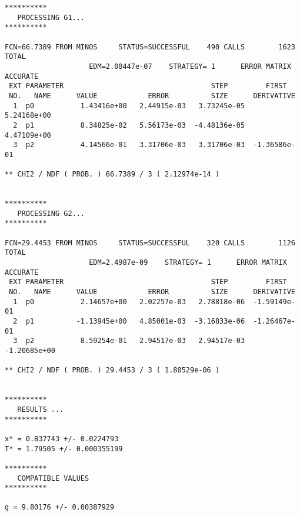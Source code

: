 {\fontsize{7}{7}
\begin{verbatim}
**********
   PROCESSING G1...
**********

FCN=66.7389 FROM MINOS     STATUS=SUCCESSFUL    490 CALLS        1623 TOTAL
                    EDM=2.00447e-07    STRATEGY= 1      ERROR MATRIX ACCURATE 
 EXT PARAMETER                                   STEP         FIRST   
 NO.   NAME      VALUE            ERROR          SIZE      DERIVATIVE 
  1  p0           1.43416e+00   2.44915e-03   3.73245e-05   5.24168e+00
  2  p1           8.34825e-02   5.56173e-03  -4.48136e-05   4.47109e+00
  3  p2           4.14566e-01   3.31706e-03   3.31706e-03  -1.36586e-01

** CHI2 / NDF ( PROB. ) 66.7389 / 3 ( 2.12974e-14 )


**********
   PROCESSING G2...
**********

FCN=29.4453 FROM MINOS     STATUS=SUCCESSFUL    320 CALLS        1126 TOTAL
                    EDM=2.4987e-09    STRATEGY= 1      ERROR MATRIX ACCURATE 
 EXT PARAMETER                                   STEP         FIRST   
 NO.   NAME      VALUE            ERROR          SIZE      DERIVATIVE 
  1  p0           2.14657e+00   2.02257e-03   2.78818e-06  -1.59149e-01
  2  p1          -1.13945e+00   4.85001e-03  -3.16833e-06  -1.26467e-01
  3  p2           8.59254e-01   2.94517e-03   2.94517e-03  -1.20685e+00

** CHI2 / NDF ( PROB. ) 29.4453 / 3 ( 1.80529e-06 )


**********
   RESULTS ...
**********

x* = 0.837743 +/- 0.0224793
T* = 1.79505 +/- 0.000355199

**********
   COMPATIBLE VALUES
**********

g = 9.80176 +/- 0.00387929
\end{verbatim}}